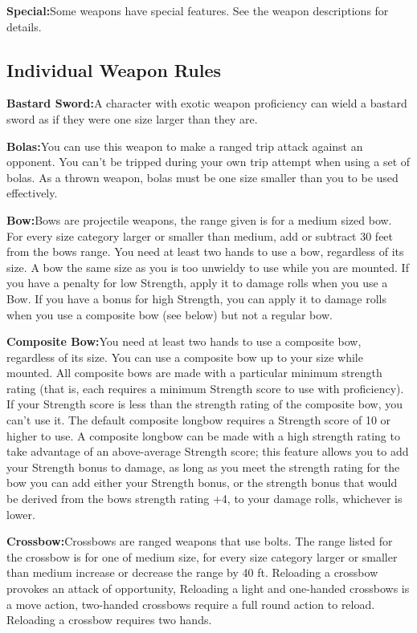 {\noindent\textbf{Special:}{Some weapons have special features. See the weapon descriptions for details.}

\subsection{Individual Weapon Rules}

\noindent\textbf{Bastard Sword:}{A character with exotic weapon proficiency can wield a bastard sword as if they were one size larger than they are.}

\noindent\textbf{Bolas:}{You can use this weapon to make a ranged trip attack against an opponent. You can't be tripped during your own trip attempt when using a set of bolas. As a thrown weapon, bolas must be one size smaller than you to be used effectively.}

\noindent\textbf{Bow:}{Bows are projectile weapons, the range given is for a medium sized bow. For every size category larger or smaller than medium, add or subtract 30 feet from the bows range. You need at least two hands to use a bow, regardless of its size. A bow the same size as you is too unwieldy to use while you are mounted. If you have a penalty for low Strength, apply it to damage rolls when you use a Bow. If you have a bonus for high Strength, you can apply it to damage rolls when you use a composite bow (see below) but not a regular bow.}

\noindent\textbf{Composite Bow:}{You need at least two hands to use a composite bow, regardless of its size. You can use a composite bow up to your size while mounted. All composite bows are made with a particular minimum strength rating (that is, each requires a minimum Strength score to use with proficiency). If your Strength score is less than the strength rating of the composite bow, you can't use it. The default composite longbow requires a Strength score of 10 or higher to use. A composite longbow can be made with a high strength rating to take advantage of an above-average Strength score; this feature allows you to add your Strength bonus to damage, as long as you meet the strength rating for the bow you can add either your Strength bonus, or the strength bonus that would be derived from the bows strength rating +4, to your damage rolls, whichever is lower.}

\noindent\textbf{Crossbow:}{Crossbows are ranged weapons that use bolts. The range listed for the crossbow is for one of medium size, for every size category larger or smaller than medium increase or decrease the range by 40 ft. Reloading a crossbow provokes an attack of opportunity, Reloading a light and one-handed crossbows is a move action, two-handed crossbows require a full round action to reload. Reloading a crossbow requires two hands.}

}
